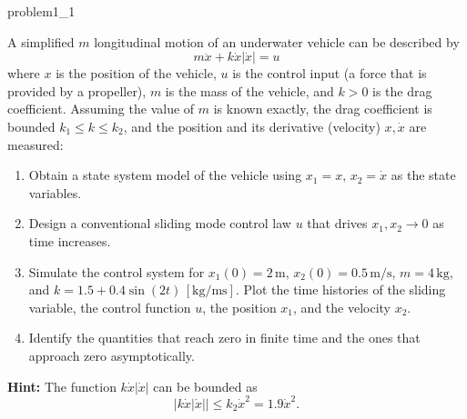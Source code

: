 \begin{problem}{1.1}{problem1_1}

A simplified $m$ longitudinal motion of an underwater vehicle can be described by
\begin{equation}
	m \ddot{x} + k \dot{x} |\dot{x}| = u
\end{equation}
where $x$ is the position of the vehicle, $u$ is the control input (a force that is provided by a propeller), $m$ is the mass of the vehicle, and $k > 0$ is the drag coefficient. Assuming the value of $m$ is known exactly, the drag coefficient is bounded $k_1 \leq k \leq k_2$, and the position and its derivative (velocity) $x, \dot{x}$ are measured:

\begin{enumerate}[label=\textbf{\alph*)}]
	\item Obtain a state system model of the vehicle using $x_1 = x, \, x_2 = \dot{x}$ as the state variables.
	\item Design a conventional sliding mode control law $u$ that drives $x_1, x_2 \rightarrow 0$ as time increases.
	\item Simulate the control system for $x_1(0) = 2\,\text{m}$, $x_2(0) = 0.5\,\text{m/s}$, $m = 4\,\text{kg}$, and $k = 1.5 + 0.4 \sin(2t)\,[\text{kg/ms}]$. Plot the time histories of the sliding variable, the control function $u$, the position $x_1$, and the velocity $x_2$.
	\item Identify the quantities that reach zero in finite time and the ones that approach zero asymptotically.
\end{enumerate}

\textbf{Hint:} The function $k\dot{x}|\dot{x}|$ can be bounded as
\[
	|k\dot{x}|\dot{x}|| \leq k_2 \dot{x}^2 = 1.9 \dot{x}^2.
\]

\end{problem}

